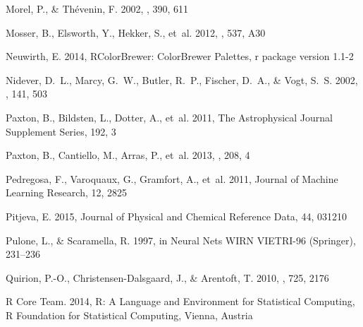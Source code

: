\documentclass[manuscript,linenumbers]{aastex6}
\begin{document}
\begin{thebibliography}{}
{Morel}, P., \& {Th{\'e}venin}, F. 2002, \aap, 390, 611

{Mosser}, B., {Elsworth}, Y., {Hekker}, S., {et~al.} 2012, \aap, 537, A30

Neuwirth, E. 2014, RColorBrewer: ColorBrewer Palettes, r package version 1.1-2

{Nidever}, D.~L., {Marcy}, G.~W., {Butler}, R.~P., {Fischer}, D.~A., \& {Vogt},
  S.~S. 2002, \apjs, 141, 503

Paxton, B., Bildsten, L., Dotter, A., {et~al.} 2011, The Astrophysical Journal
  Supplement Series, 192, 3

{Paxton}, B., {Cantiello}, M., {Arras}, P., {et~al.} 2013, \apjs, 208, 4

Pedregosa, F., Varoquaux, G., Gramfort, A., {et~al.} 2011, Journal of Machine
  Learning Research, 12, 2825

Pitjeva, E. 2015, Journal of Physical and Chemical Reference Data, 44, 031210

Pulone, L., \& Scaramella, R. 1997, in Neural Nets WIRN VIETRI-96 (Springer),
  231--236

{Quirion}, P.-O., {Christensen-Dalsgaard}, J., \& {Arentoft}, T. 2010, \apj,
  725, 2176

{R Core Team}. 2014, R: A Language and Environment for Statistical Computing, R
  Foundation for Statistical Computing, Vienna, Austria


\end{thebibliography}
\end{document}
